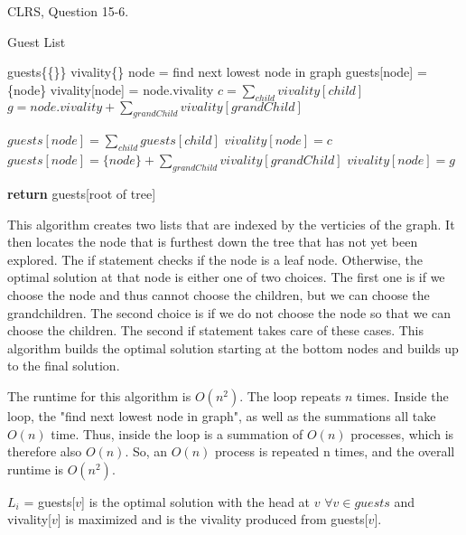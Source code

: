 \documentclass{article}
\begin{document}
\nextprob
CLRS, Question 15-6.

\begin{algorithm}
    \caption{Guest List}\label{guests}
    \begin{algorithmic}[1]
        \State guests\{\{\}\}
        \State vivality\{\}
			\State node = find next lowest node in graph
				\State guests[node] = \{node\}
				\State vivality[node] = node.vivality
			\Else
				\State $c = \sum_{child} vivality[child]$
				\State $g = node.vivality + \sum_{grandChild} vivality[grandChild]$

					\State $guests[node] = \sum_{child} guests[child]$
					\State $vivality[node] = c$
				\Else
					\State $guests[node] = \{node\} + \sum_{grandChild} vivality[grandChild]$
					\State $vivality[node] = g$
				\EndIf
			\EndIf
		\EndFor

       \State \textbf{return} guests[root of tree]

    \EndFunction
    \end{algorithmic}
\end{algorithm}

This algorithm creates two lists that are indexed by the verticies of the graph. It then locates the node that is furthest down the tree that has not yet been explored. The if statement checks if the node is a leaf node. Otherwise, the optimal solution at that node is either one of two choices. The first one is if we choose the node and thus cannot choose the children, but we can choose the grandchildren. The second choice is if we do not choose the node so that we can choose the children. The second if statement takes care of these cases. This algorithm builds the optimal solution starting at the bottom nodes and builds up to the final solution.
 
 The runtime for this algorithm is $O(n^2)$. The loop repeats $n$ times. Inside the loop, the "find next lowest node in graph", as well as the summations all take $O(n)$ time. Thus, inside the loop is a summation of $O(n)$ processes, which is therefore also $O(n)$. So, an $O(n)$ process is repeated n times, and the overall runtime is $O(n^2)$.
 

 $L_i$ = guests[$v$] is the optimal solution with the head at $v$ $\forall v \in guests$ and vivality[$v$] is maximized and is the vivality produced from guests[$v$].
 
\end{document}
